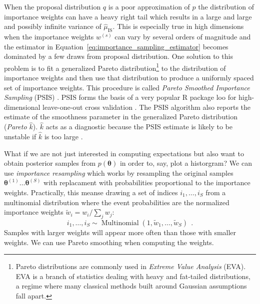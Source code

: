 \documentclass[12pt,dvipsnames]{report}
\newcommand{\ssf}[1]{\textsf{#1}}
\renewcommand{\vec}[1]{\boldsymbol{\mathbf{#1}}}
\newcommand{\hquad}{~~}
\begin{document}
When the proposal distribution $q$ is a poor approximation of $p$ the distribution of 
importance weights can have a heavy right tail which results in a large and 
large and possibly infinite variance of $\hat{\mu}_{\mathrm{IS}}$.
This is especially true in high dimensions when the importance weights $w^{(s)}$ can 
vary by several orders of magnitude and the estimator in 
Equation~\ref{eq:importance_sampling_estimator} becomes dominated by a few draws from 
proposal distribution. One solution to this  problem is to fit a generalized 
Pareto distribution\footnote{Pareto distributions are commonly used in \textsl{Extreme 
Value Analysis} (EVA). EVA is a branch of statistics dealing with heavy and fat-tailed 
distributions, a regime where many classical methods built around Gaussian assumptions 
fall apart.} 
to the distribution of importance weights and then use that distribution to produce 
a uniformly spaced set of importance weights. This procedure is called 
\textsl{Pareto Smoothed Importance Sampling} (PSIS) \citep{arXiv:1507.02646}.
PSIS forms the basis of a very popular \ssf{R} package \ssf{loo} for 
high-dimensional leave-one-out cross validation \citep{arXiv:1507.04544}.
The PSIS algorithm also reports the estimate of the smoothness parameter in the
generalized Pareto distribution (\textsl{Pareto $\hat{k}$}). $\hat{k}$ acts as a 
diagnostic  because the PSIS estimate is likely to be unstable  if $\hat{k}$ is 
too large \citep{arXiv:1507.02646}.

What if we are not just interested in computing expectations but also want to obtain 
posterior samples from $p(\vec{\theta})$ in order to, say, plot a historgram? We can 
use \textsl{importance resampling} which works by resampling the original samples 
$\vec{\theta}^{(1)} \dots \vec{\theta}^{(S)}$
with replacament with probabilities proportional to  the importance weights.
Practically, this meanse drawing a set of indices $i_1, \dots, i_S$ from a 
multinomial distribution  where the event probabilities are the normalized importance 
weights $\tilde{w}_{i}=w_{i} / \sum_{j} w_{j}$:
\begin{equation}
i_{1}, \ldots, i_{S} \sim \operatorname{Multinomial}\left(1, \tilde{w}_{1}, \ldots, \tilde{w}_{S}\right)\hquad .
\end{equation}
Samples with larger weights will appear more often than those with smaller weights. 
We can use Pareto smoothing when computing the weights. 
\end{document}
